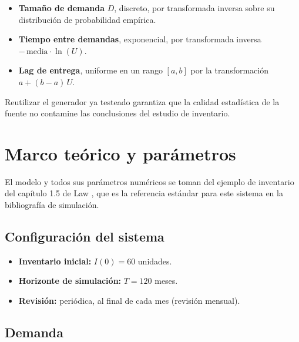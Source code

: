 \documentclass[11pt]{article}
\begin{document}
\begin{itemize}
  \item \textbf{Tama\~no de demanda} $D$, discreto, por transformada inversa
    sobre su distribuci\'on de probabilidad emp\'irica.
  \item \textbf{Tiempo entre demandas}, exponencial, por transformada inversa
    $-\,\text{media}\cdot\ln(U)$.
  \item \textbf{Lag de entrega}, uniforme en un rango $[a, b]$ por la
    transformaci\'on $a + (b-a)\,U$.
\end{itemize}

Reutilizar el generador ya testeado garantiza que la calidad estad\'istica de
la fuente no contamine las conclusiones del estudio de inventario.

\section{Marco te\'orico y par\'ametros}

El modelo y todos sus par\'ametros num\'ericos se toman del ejemplo de
inventario del cap\'itulo 1.5 de Law \cite{law}, que es la referencia est\'andar
para este sistema en la bibliograf\'ia de simulaci\'on.

\subsection{Configuraci\'on del sistema}

\begin{itemize}
  \item \textbf{Inventario inicial:} $I(0) = 60$ unidades.
  \item \textbf{Horizonte de simulaci\'on:} $T = 120$ meses.
  \item \textbf{Revisi\'on:} peri\'odica, al final de cada mes (revisi\'on
    mensual).
\end{itemize}

\subsection{Demanda}
\end{document}
